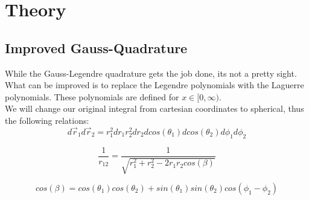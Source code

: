 \documentclass[../main.tex]{subfiles}
\begin{document}
\section{Theory} \label{sec:theory}

\subsection{Improved Gauss-Quadrature} \label{sec:improved_GQ}
While the Gauss-Legendre quadrature gets the job done, its not a pretty sight. What can be improved is to replace the Legendre polynomials with the Laguerre polynomials. These polynomials are defined for $x \in [0, \infty)$.
\\
We will change our original integral from cartesian coordinates to spherical, thus the following relations:
\[ d\vec{r}_1 d\vec{r}_2 = r_1^2 dr_1 r_2^2 dr_2 dcos(\theta_1) dcos(\theta_2) d\phi_1 d\phi_2\]

\[\frac{1}{r_{12}} = \frac{1}{\sqrt{r_1^2 + r_2^2 - 2r_1r_2cos(\beta)}} \]

\[cos(\beta) = cos(\theta_1)cos(\theta_2) + sin(\theta_1)sin(\theta_2)cos(\phi_1 - \phi_2)\]
\end{document}
